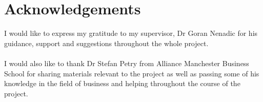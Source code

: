 \documentclass[12pt]{report}
\begin{document}
\chapter*{Acknowledgements}
I would like to express my gratitude to my supervisor, Dr Goran Nenadic for
his guidance, support and suggestions throughout the whole project.\\\\
I would also like to thank Dr Stefan Petry from Alliance Manchester Business
School for sharing materials relevant to the project as well as passing some of his knowledge in the field of business and helping throughout the course of the project.

\tableofcontents
\listoffigures
\listoftables







\medskip
\end{document}
